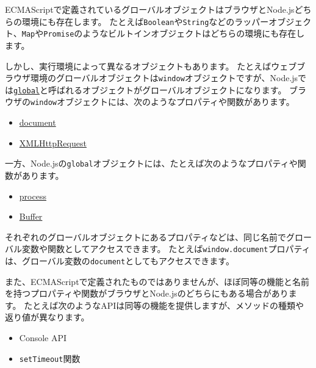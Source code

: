 ECMAScriptで定義されているグローバルオブジェクトはブラウザとNode.jsどちらの環境にも存在します。
たとえば\texttt{Boolean}や\texttt{String}などのラッパーオブジェクト、\texttt{Map}や\texttt{Promise}のようなビルトインオブジェクトはどちらの環境にも存在します。

しかし、実行環境によって異なるオブジェクトもあります。
たとえばウェブブラウザ環境のグローバルオブジェクトは\texttt{window}オブジェクトですが、Node.jsでは\href{https://nodejs.org/docs/latest-v12.x/api/globals.html}{\texttt{global}}と呼ばれるオブジェクトがグローバルオブジェクトになります。
ブラウザの\texttt{window}オブジェクトには、次のようなプロパティや関数があります。

\begin{itemize}
\item
  \href{https://developer.mozilla.org/ja/docs/Web/API/Document}{document}
\item
  \href{https://developer.mozilla.org/ja/docs/Web/API/XMLHttpRequest}{XMLHttpRequest}
\end{itemize}

一方、Node.jsの\texttt{global}オブジェクトには、たとえば次のようなプロパティや関数があります。

\begin{itemize}
\item
  \href{https://nodejs.org/docs/latest-v12.x/api/process.html\#process_process}{process}
\item
  \href{https://nodejs.org/docs/latest-v12.x/api/buffer.html}{Buffer}
\end{itemize}

それぞれのグローバルオブジェクトにあるプロパティなどは、同じ名前でグローバル変数や関数としてアクセスできます。
たとえば\texttt{window.document}プロパティは、グローバル変数の\texttt{document}としてもアクセスできます。

また、ECMAScriptで定義されたものではありませんが、ほぼ同等の機能と名前を持つプロパティや関数がブラウザとNode.jsのどちらにもある場合があります。
たとえば次のようなAPIは同等の機能を提供しますが、メソッドの種類や返り値が異なります。

\begin{itemize}
\item
  Console API
\item
  \texttt{setTimeout}関数
\end{itemize}

